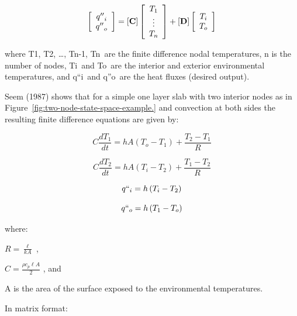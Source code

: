 \begin{equation}
\left[\begin{array}{c}{q''}_i \\ {q''}_o\end{array}\right] = \left[\bf{C}\right]\left[\begin{array}{c}T_1 \\ \vdots \\ T_n\end{array}\right]+\left[\bf{D}\right]\left[\begin{array}{c}T_i \\ T_o\end{array}\right]
\end{equation}

where T1, T2, \ldots{}, Tn-1, Tn~are the finite difference nodal temperatures, n is the number of nodes, Ti~and To~are the interior and exterior environmental temperatures, and q``i~and q''o~are the heat fluxes (desired output).

Seem (1987) shows that for a simple one layer slab with two interior nodes as in Figure~\ref{fig:two-node-state-space-example.} and convection at both sides the resulting finite difference equations are given by:

\begin{equation}
C\frac{{d{T_1}}}{{dt}} = hA\left( {{T_o} - {T_1}} \right) + \frac{{{T_2} - {T_1}}}{R}
\end{equation}

\begin{equation}
C\frac{{d{T_2}}}{{dt}} = hA\left( {{T_i} - {T_2}} \right) + \frac{{{T_1} - {T_2}}}{R}
\end{equation}

\begin{equation}
q{``_i} = h\left( {{T_i} - {T_2}} \right)
\end{equation}

\begin{equation}
q{``_o} = h\left( {{T_1} - {T_o}} \right)
\end{equation}

where:

\(R = \frac{\ell }{{kA}}\) ,

\(C = \frac{{\rho {c_p}\ell A}}{2}\) , and

A is the area of the surface exposed to the environmental temperatures.

In matrix format:

